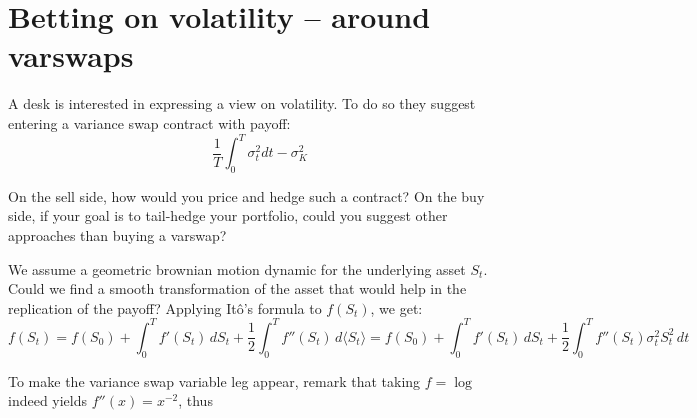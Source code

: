 \section{Betting on volatility -- around varswaps}

\begin{tcolorbox}[width=\linewidth, sharp corners=all, colback=white!95!black]
    A desk is interested in expressing a view on volatility. To do so they suggest entering a variance swap contract with payoff:
    \[\dfrac{1}{T} \displaystyle \int_{0}^{T} \sigma_t^2 dt - \sigma_K^2\]

    On the sell side, how would you price and hedge such a contract?\newline
    On the buy side, if your goal is to tail-hedge your portfolio, could you suggest other approaches than buying a varswap?

\end{tcolorbox}

We assume a geometric brownian motion dynamic for the underlying asset $S_t$. Could we find a smooth transformation of the asset that would help in the replication of the payoff? Applying Itô's formula to $f(S_t)$, we get:
\[
f(S_t) = f(S_0) + \displaystyle \int_0^T f'(S_t) \,dS_t + \dfrac{1}{2}\displaystyle \int_0^T f''(S_t) \,d\langle S_t\rangle = f(S_0) + \displaystyle \int_0^T f'(S_t) \,dS_t + \dfrac{1}{2}\displaystyle \int_0^T f''(S_t) \sigma_t^2 S_t^2 \,dt
\]

To make the variance swap variable leg appear, remark that taking $f = \log$ indeed yields $f''(x) = x^{-2}$, thus 